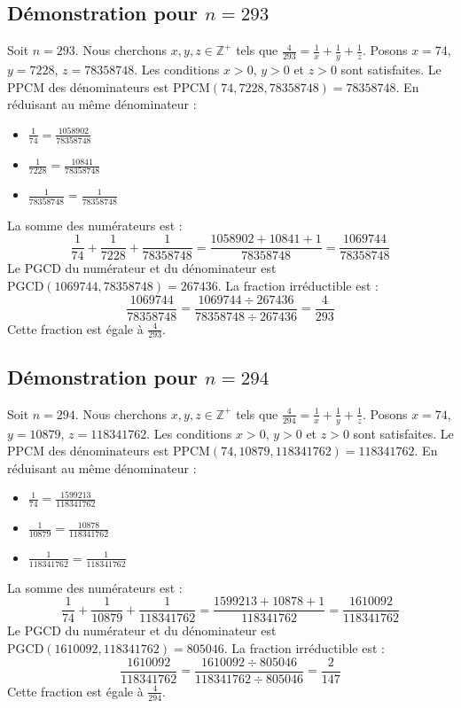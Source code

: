 \documentclass[11pt,a4paper]{article}
\begin{document}
\subsection{Démonstration pour $n = 293$}
Soit $n = 293$. Nous cherchons $x, y, z \in \mathbb{Z}^{+}$ tels que $\frac{4}{293} = \frac{1}{x} + \frac{1}{y} + \frac{1}{z}$.
Posons $x = 74$, $y = 7228$, $z = 78358748$.
Les conditions $x > 0$, $y > 0$ et $z > 0$ sont satisfaites.
Le PPCM des dénominateurs est $\text{PPCM}(74, 7228, 78358748) = 78358748$.
En réduisant au même dénominateur :
\begin{itemize}
    \item $\frac{1}{74} = \frac{1058902}{78358748}$
    \item $\frac{1}{7228} = \frac{10841}{78358748}$
    \item $\frac{1}{78358748} = \frac{1}{78358748}$
\end{itemize}
La somme des numérateurs est :
$$ \frac{1}{74} + \frac{1}{7228} + \frac{1}{78358748} = \frac{1058902 + 10841 + 1}{78358748} = \frac{1069744}{78358748} $$
Le PGCD du numérateur et du dénominateur est $\text{PGCD}(1069744, 78358748) = 267436$.
La fraction irréductible est :
$$ \frac{1069744}{78358748} = \frac{1069744 \div 267436}{78358748 \div 267436} = \frac{4}{293} $$
Cette fraction est égale à $\frac{4}{293}$.

\subsection{Démonstration pour $n = 294$}
Soit $n = 294$. Nous cherchons $x, y, z \in \mathbb{Z}^{+}$ tels que $\frac{4}{294} = \frac{1}{x} + \frac{1}{y} + \frac{1}{z}$.
Posons $x = 74$, $y = 10879$, $z = 118341762$.
Les conditions $x > 0$, $y > 0$ et $z > 0$ sont satisfaites.
Le PPCM des dénominateurs est $\text{PPCM}(74, 10879, 118341762) = 118341762$.
En réduisant au même dénominateur :
\begin{itemize}
    \item $\frac{1}{74} = \frac{1599213}{118341762}$
    \item $\frac{1}{10879} = \frac{10878}{118341762}$
    \item $\frac{1}{118341762} = \frac{1}{118341762}$
\end{itemize}
La somme des numérateurs est :
$$ \frac{1}{74} + \frac{1}{10879} + \frac{1}{118341762} = \frac{1599213 + 10878 + 1}{118341762} = \frac{1610092}{118341762} $$
Le PGCD du numérateur et du dénominateur est $\text{PGCD}(1610092, 118341762) = 805046$.
La fraction irréductible est :
$$ \frac{1610092}{118341762} = \frac{1610092 \div 805046}{118341762 \div 805046} = \frac{2}{147} $$
Cette fraction est égale à $\frac{4}{294}$.
\end{document}
